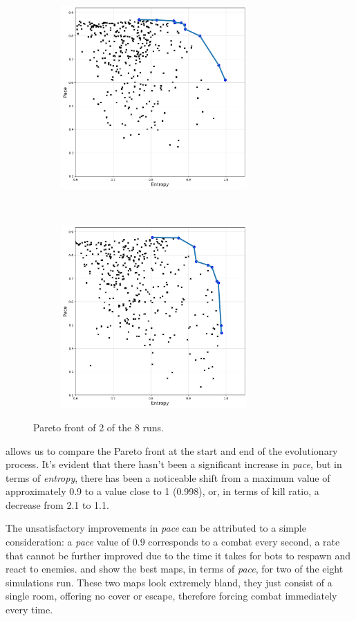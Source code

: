 \begin{figure}[hbtp]
    \centering
    \begin{subfigure}[t]{0.5\textwidth}
        \centering
        \includegraphics[height=7cm]{Images/images/experiment_one/Pareto/pareto_front_population_0.png}
    \end{subfigure}%
    ~ 
    \begin{subfigure}[t]{0.5\textwidth}
        \centering
        \includegraphics[height=7cm]{Images/images/experiment_one/Pareto/pareto_front_population_1.png}
    \end{subfigure}
    \caption{Pareto front of 2 of the 8 runs.}
    \label{fig:ex_one_pareto_populations}
\end{figure}


 allows us to compare the Pareto front at the start and end of the evolutionary process. It's evident that there hasn't been a significant increase in \textit{pace}, but in terms of \textit{entropy}, there has been a noticeable shift from a maximum value of approximately 0.9 to a value close to 1 (0.998), or, in terms of kill ratio, a decrease from 2.1 to 1.1.

The unsatisfactory improvements in \textit{pace} can be attributed to a simple consideration: a \textit{pace} value of $0.9$ corresponds to a combat every second, a rate that cannot be further improved due to the time it takes for bots to respawn and react to enemies. 
 and  show the best maps, in terms of \textit{pace}, for two of the eight simulations run. These two maps look extremely bland, they just consist of a single room, offering no cover or escape, therefore forcing combat immediately every time.

